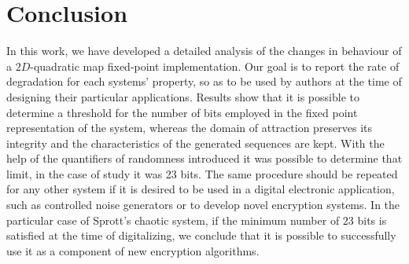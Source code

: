 \section{Conclusion} \label{sec:conclusions}
In this work, we have developed a detailed analysis of the changes in behaviour of a $2D$-quadratic map fixed-point implementation. Our goal is to report the rate of degradation for each systems' property, so as to be used by authors at the time of designing their particular applications. Results show that it is possible to determine a threshold for the number of bits employed in the fixed point representation of the system, whereas the domain of attraction preserves its integrity and the characteristics of the generated sequences are kept.
With the help of the quantifiers of randomness introduced it was possible to determine that limit, in the case of study it was 23 bits. The same procedure should be repeated for any other system if it is desired to be used in a digital electronic application, such as controlled noise generators or to develop novel encryption systems. In the particular case of Sprott's chaotic system, if the minimum number of 23 bits is satisfied at the time of digitalizing, we conclude that it is possible to successfully use it as a component of new encryption algorithms.